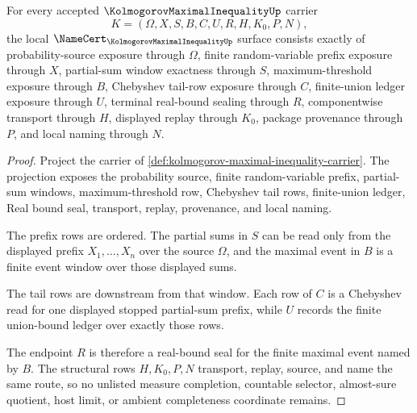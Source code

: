 \begin{theorem}
\label{thm:kolmogorov-maximal-inequality-namecert-obligations}
For every accepted $\KolmogorovMaximalInequalityUp$ carrier
$$
K=(\Omega,X,S,B,C,U,R,H,K_0,P,N),
$$
the local $\NameCert_{\KolmogorovMaximalInequalityUp}$ surface consists exactly of probability-source exposure through $\Omega$, finite random-variable prefix exposure through $X$, partial-sum window exactness through $S$, maximum-threshold exposure through $B$, Chebyshev tail-row exposure through $C$, finite-union ledger exposure through $U$, terminal real-bound sealing through $R$, componentwise transport through $H$, displayed replay through $K_0$, package provenance through $P$, and local naming through $N$.
\end{theorem}
\begin{proof}
Project the carrier of \autoref{def:kolmogorov-maximal-inequality-carrier}. The projection exposes the probability source, finite random-variable prefix, partial-sum windows, maximum-threshold row, Chebyshev tail rows, finite-union ledger, Real bound seal, transport, replay, provenance, and local naming.

The prefix rows are ordered. The partial sums in $S$ can be read only from the displayed prefix $X_1,\ldots,X_n$ over the source $\Omega$, and the maximal event in $B$ is a finite event window over those displayed sums.

The tail rows are downstream from that window. Each row of $C$ is a Chebyshev read for one displayed stopped partial-sum prefix, while $U$ records the finite union-bound ledger over exactly those rows.

The endpoint $R$ is therefore a real-bound seal for the finite maximal event named by $B$. The structural rows $H,K_0,P,N$ transport, replay, source, and name the same route, so no unlisted measure completion, countable selector, almost-sure quotient, host limit, or ambient completeness coordinate remains.
\end{proof}

